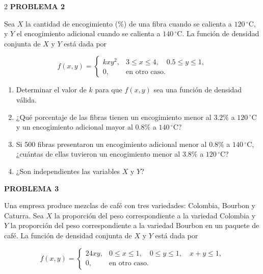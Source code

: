 \documentclass[10pt,letterpaper]{article}
\newcommand{\problema}[1]{%
  \vspace{2pt}
  \noindent\textbf{\large PROBLEMA #1}\par
  \vspace{2pt}
}
\begin{document}
\begin{multicols}{2}
\problema{2}

Sea \(X\) la cantidad de encogimiento (\%) de una fibra cuando se calienta a
\(120\,^{\circ}\mathrm{C}\), y \(Y\) el encogimiento adicional cuando se
calienta a \(140\,^{\circ}\mathrm{C}\). La función de densidad conjunta de
\(X\) y \(Y\) está dada por

\[
f(x,y)=
\begin{cases}
kxy^2, & 3\leq x\leq4,\quad 0.5\leq y\leq1,\\
0, & \text{en otro caso}.
\end{cases}
\]

\begin{enumerate}
\item Determinar el valor de \(k\) para que \(f(x,y)\) sea una función de
densidad válida.
\item ¿Qué porcentaje de las fibras tienen un encogimiento menor al \(3.2\%\)
a \(120\,^{\circ}\mathrm{C}\) y un encogimiento adicional mayor al \(0.8\%\)
a \(140\,^{\circ}\mathrm{C}\)?
\item Si 500 fibras presentaron un encogimiento adicional menor al \(0.8\%\)
a \(140\,^{\circ}\mathrm{C}\), ¿cuántas de ellas tuvieron un encogimiento
menor al \(3.8\%\) a \(120\,^{\circ}\mathrm{C}\)?
\item ¿Son independientes las variables \(X\) y \(Y\)?
\end{enumerate}

\problema{3}

Una empresa produce mezclas de café con tres variedades: Colombia, Bourbon y
Caturra. Sea \(X\) la proporción del peso correspondiente a la variedad
Colombia y \(Y\) la proporción del peso correspondiente a la variedad Bourbon
en un paquete de café. La función de densidad conjunta de \(X\) y \(Y\) está
dada por

\[
f(x,y)=
\begin{cases}
24xy, & 0\leq x\leq1,\quad 0\leq y\leq1,\quad x+y\leq1,\\
0, & \text{en otro caso}.
\end{cases}
\]


\end{multicols}
\end{document}
